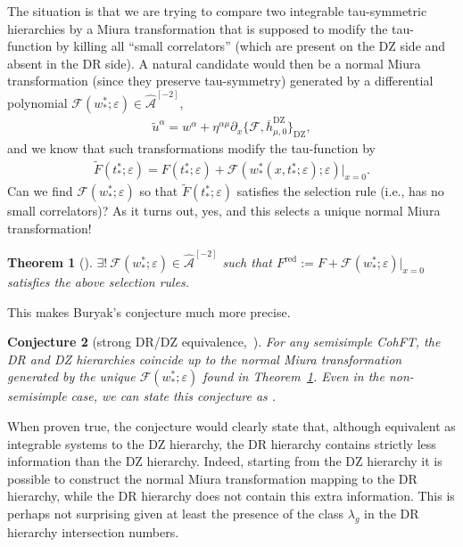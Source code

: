 \documentclass[pdftex]{sigma}
\numberwithin{equation}{section}
\newtheorem{Theorem}{Theorem}[section]
\newtheorem{Conjecture}[Theorem]{Conjecture}
\newcommand{\oh}{\overline h}
\def\d{{\partial}}
\newcommand{\<}{\left<}
\renewcommand{\>}{\right>}
\newcommand{\eps}{\varepsilon}
\newcommand{\hcA}{\widehat{\mathcal A}}
\newcommand{\DR}{\mathrm{DR}}
\newcommand{\DZ}{\mathrm{DZ}}
\newcommand{\cF}{\mathcal F}
\begin{document}
The situation is that we are trying to compare two integrable tau-symmetric hierarchies by a Miura transformation that is supposed to modify the tau-function by killing all ``small correlators'' (which are present on the DZ side and absent in the DR side). A natural candidate would then be a normal Miura transformation (since they preserve tau-symmetry) generated by a dif\/ferential polynomial $\cF(w^*_*;\eps) \in \hcA^{[-2]}$,
\begin{gather*}\widetilde{u}^\alpha = w^\alpha + \eta^{\alpha\mu} \d_x \big\{ \cF, \oh^{\DZ}_{\mu,0} \big\}_{\DZ},\end{gather*}
and we know that such transformations modify the tau-function by
\begin{gather*}\widetilde{F}(t^*_*;\eps) = F(t^*_*;\eps)+ \cF(w^*_*(x,t^*_*;\eps);\eps)\big|_{x=0}.\end{gather*}
Can we f\/ind $\cF(w^*_*;\eps)$ so that $\widetilde{F}(t^*_*;\eps)$ satisf\/ies the selection rule (i.e., has no small correlators)? As it turns out, yes, and this selects a unique normal Miura transformation!

\begin{Theorem}[\cite{BDGR16a}]\label{thm:unique}
$\exists! \ \cF(w^*_*;\eps) \in \hcA^{[-2]}$ such that $F^\mathrm{red}:=F+ \cF(w^*_*;\eps)|_{x=0}$ satisfies the above selection rules.
\end{Theorem}

This makes Buryak's conjecture much more precise.

\begin{Conjecture}[strong DR/DZ equivalence,~\cite{BDGR16a}]\label{conj:strong}
For any semisimple CohFT, the DR and DZ hierarchies coincide up to the normal Miura transformation generated by the unique $\cF(w^*_*;\eps)$ found in Theorem~{\rm \ref{thm:unique}}. Even in the non-semisimple case, we can state this conjecture as \smash{$F^\mathrm{red}=F^{\DR}$}.
\end{Conjecture}

When proven true, the conjecture would clearly state that, although equivalent as integrable systems to the DZ hierarchy, the DR hierarchy contains strictly less information than the DZ hierarchy. Indeed, starting from the DZ hierarchy it is possible to construct the normal Miura transformation mapping to the DR hierarchy, while the DR hierarchy does not contain this extra information. This is perhaps not surprising given at least the presence of the class $\lambda_g$ in the DR hierarchy intersection numbers.
\end{document}
